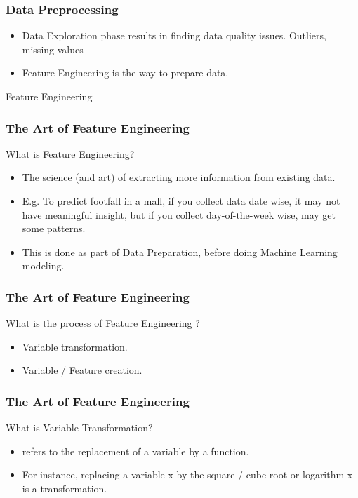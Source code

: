 \begin{frame}[fragile]\frametitle{Data Preprocessing}	
\begin{itemize}
\item Data Exploration phase results in finding data quality issues. Outliers, missing values
\item Feature Engineering is the way to prepare data.

\end{itemize}
\end{frame}


\begin{frame}
  \begin{center}
    {\Large Feature Engineering}
  \end{center}
\end{frame}



\begin{frame}[fragile]\frametitle{The Art of Feature Engineering}
What is Feature Engineering? 
	\begin{itemize}
	\item The science (and art) of extracting more information from existing data. 
\item E.g. To predict footfall in a mall, if you collect data date wise, it may not have meaningful insight, but if you collect day-of-the-week wise, may get some patterns.
\item This is done as part of Data Preparation, before doing Machine Learning modeling.
	\end{itemize}
\end{frame}

\begin{frame}[fragile]\frametitle{The Art of Feature Engineering}
What is the process of Feature Engineering ? 
	\begin{itemize}
	\item Variable transformation. 
	\item Variable / Feature creation. 
	\end{itemize}
\end{frame}


\begin{frame}[fragile]\frametitle{The Art of Feature Engineering}
What is Variable Transformation? 
	\begin{itemize}
	\item  refers to the replacement of a variable by a function.
\item For 
instance, replacing a variable x by the square / cube root or logarithm x is a transformation.

	\end{itemize}
\end{frame}


